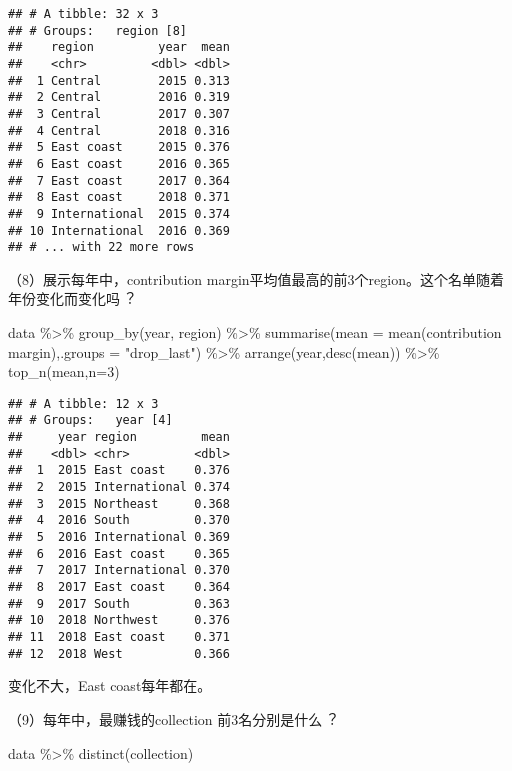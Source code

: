 \documentclass[
]{article}
\newenvironment{Shaded}{\begin{snugshade}}{\end{snugshade}}
\newcommand{\AttributeTok}[1]{\textcolor[rgb]{0.77,0.63,0.00}{#1}}
\newcommand{\DecValTok}[1]{\textcolor[rgb]{0.00,0.00,0.81}{#1}}
\newcommand{\FunctionTok}[1]{\textcolor[rgb]{0.00,0.00,0.00}{#1}}
\newcommand{\NormalTok}[1]{#1}
\newcommand{\SpecialCharTok}[1]{\textcolor[rgb]{0.00,0.00,0.00}{#1}}
\newcommand{\StringTok}[1]{\textcolor[rgb]{0.31,0.60,0.02}{#1}}
\begin{document}
\begin{verbatim}
## # A tibble: 32 x 3
## # Groups:   region [8]
##    region         year  mean
##    <chr>         <dbl> <dbl>
##  1 Central        2015 0.313
##  2 Central        2016 0.319
##  3 Central        2017 0.307
##  4 Central        2018 0.316
##  5 East coast     2015 0.376
##  6 East coast     2016 0.365
##  7 East coast     2017 0.364
##  8 East coast     2018 0.371
##  9 International  2015 0.374
## 10 International  2016 0.369
## # ... with 22 more rows
\end{verbatim}

（8）展⽰每年中，contribution
margin平均值最⾼的前3个region。这个名单随着年份变化⽽变化吗︖

\begin{Shaded}
\begin{Highlighting}[]
\NormalTok{data }\SpecialCharTok{\%\textgreater{}\%}
  \FunctionTok{group\_by}\NormalTok{(year, region) }\SpecialCharTok{\%\textgreater{}\%}
  \FunctionTok{summarise}\NormalTok{(}\AttributeTok{mean =} \FunctionTok{mean}\NormalTok{(}\StringTok{\textasciigrave{}}\AttributeTok{contribution margin}\StringTok{\textasciigrave{}}\NormalTok{),}\AttributeTok{.groups =} \StringTok{"drop\_last"}\NormalTok{) }\SpecialCharTok{\%\textgreater{}\%}
  \FunctionTok{arrange}\NormalTok{(year,}\FunctionTok{desc}\NormalTok{(mean)) }\SpecialCharTok{\%\textgreater{}\%}
  \FunctionTok{top\_n}\NormalTok{(mean,}\AttributeTok{n=}\DecValTok{3}\NormalTok{)}
\end{Highlighting}
\end{Shaded}

\begin{verbatim}
## # A tibble: 12 x 3
## # Groups:   year [4]
##     year region         mean
##    <dbl> <chr>         <dbl>
##  1  2015 East coast    0.376
##  2  2015 International 0.374
##  3  2015 Northeast     0.368
##  4  2016 South         0.370
##  5  2016 International 0.369
##  6  2016 East coast    0.365
##  7  2017 International 0.370
##  8  2017 East coast    0.364
##  9  2017 South         0.363
## 10  2018 Northwest     0.376
## 11  2018 East coast    0.371
## 12  2018 West          0.366
\end{verbatim}

变化不大，East coast每年都在。

（9）每年中，最赚钱的collection 前3名分别是什么︖

\begin{Shaded}
\begin{Highlighting}[]
\NormalTok{data }\SpecialCharTok{\%\textgreater{}\%}
  \FunctionTok{distinct}\NormalTok{(collection)}
\end{Highlighting}
\end{Shaded}
\end{document}

